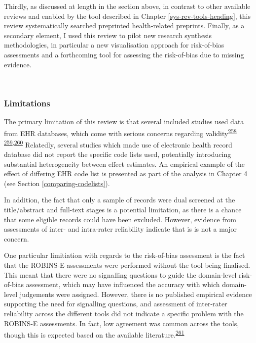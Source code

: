 \documentclass[a4paper, twoside]{templates/ociamthesis}
\begin{document}
Thirdly, as discussed at length in the section above, in contrast to other available reviews and enabled by the tool described in Chapter \ref{sys-rev-tools-heading}, this review systematically searched preprinted health-related preprints. Finally, as a secondary element, I used this review to pilot new research synthesis methodologies, in particular a new visualisation approach for risk-of-bias assessments and a forthcoming tool for assessing the risk-of-bias due to missing evidence.

~

\hypertarget{limitations}{%
\subsubsection{Limitations}\label{limitations}}

The primary limitation of this review is that several included studies used data from EHR databases, which come with serious concerns regarding validity\textsuperscript{\protect\hyperlink{ref-hsieh2019}{258}} \textsuperscript{\protect\hyperlink{ref-mcguinness2019validity}{259},\protect\hyperlink{ref-wilkinson2018}{260}} Relatedly, several studies which made use of electronic health record database did not report the specific code lists used, potentially introducing substantial heterogeneity between effect estimates. An empirical example of the effect of differing EHR code list is presented as part of the analysis in Chapter 4 (see Section \ref{comparing-codelists}).

In addition, the fact that only a sample of records were dual screened at the title/abstract and full-text stages is a potential limitation, as there is a chance that some eligible records could have been excluded. However, evidence from assessments of inter- and intra-rater reliability indicate that is is not a major concern.

One particular limitiation with regards to the risk-of-bias assessment is the fact that the ROBINS-E assessments were performed without the tool being finalised. This meant that there were no signalling questions to guide the domain-level risk-of-bias assessment, which may have influenced the accuracy with which domain-level judgements were assigned. However, there is no published empirical evidence supporting the need for signalling questions, and assessment of inter-rater reliability across the different tools did not indicate a specific problem with the ROBINS-E assessments. In fact, low agreement was common across the tools, though this is expected based on the available literature.\textsuperscript{\protect\hyperlink{ref-jeyaraman2020}{261}}
\end{document}
